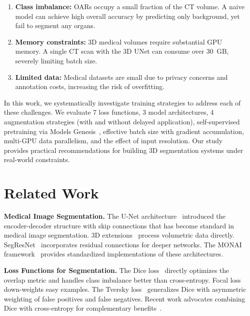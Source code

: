 \documentclass[10pt,twocolumn]{article}
\begin{document}
\begin{enumerate}[leftmargin=*]
    \item \textbf{Class imbalance:} OARs occupy a small fraction of the CT volume. A naive model can achieve high overall accuracy by predicting only background, yet fail to segment any organs.
    \item \textbf{Memory constraints:} 3D medical volumes require substantial GPU memory. A single CT scan with the 3D UNet can consume over 30~GB, severely limiting batch size.
    \item \textbf{Limited data:} Medical datasets are small due to privacy concerns and annotation costs, increasing the risk of overfitting.
\end{enumerate}

In this work, we systematically investigate training strategies to address each of these challenges. We evaluate 7 loss functions, 3 model architectures, 4 augmentation strategies (with and without delayed application), self-supervised pretraining via Models Genesis~\cite{zhou2021models}, effective batch size with gradient accumulation, multi-GPU data parallelism, and the effect of input resolution. Our study provides practical recommendations for building 3D segmentation systems under real-world constraints.

\section{Related Work}
\label{sec:related}

\textbf{Medical Image Segmentation.}
The U-Net architecture~\cite{ronneberger2015unet} introduced the encoder-decoder structure with skip connections that has become standard in medical image segmentation. 3D extensions~\cite{cicek20163d} process volumetric data directly. SegResNet~\cite{myronenko20193d} incorporates residual connections for deeper networks. The MONAI framework~\cite{monai2020} provides standardized implementations of these architectures.

\textbf{Loss Functions for Segmentation.}
The Dice loss~\cite{milletari2016vnet} directly optimizes the overlap metric and handles class imbalance better than cross-entropy. Focal loss~\cite{lin2017focal} down-weights easy examples. The Tversky loss~\cite{salehi2017tversky} generalizes Dice with asymmetric weighting of false positives and false negatives. Recent work advocates combining Dice with cross-entropy for complementary benefits~\cite{isensee2021nnu}.
\end{document}
